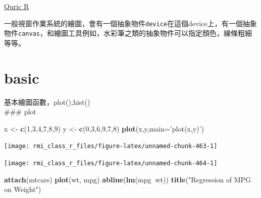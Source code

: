 \documentclass[]{book}
\newenvironment{Shaded}{\begin{snugshade}}{\end{snugshade}}
\newcommand{\DataTypeTok}[1]{\textcolor[rgb]{0.13,0.29,0.53}{#1}}
\newcommand{\DecValTok}[1]{\textcolor[rgb]{0.00,0.00,0.81}{#1}}
\newcommand{\KeywordTok}[1]{\textcolor[rgb]{0.13,0.29,0.53}{\textbf{#1}}}
\newcommand{\NormalTok}[1]{#1}
\newcommand{\OperatorTok}[1]{\textcolor[rgb]{0.81,0.36,0.00}{\textbf{#1}}}
\newcommand{\StringTok}[1]{\textcolor[rgb]{0.31,0.60,0.02}{#1}}
\theoremstyle{definition}
\theoremstyle{definition}
\theoremstyle{definition}
\theoremstyle{remark}
\begin{document}
\href{https://www.statmethods.net/graphs/creating.html}{Quric R}

一般視窗作業系統的繪圖，會有一個抽象物件\texttt{device}在這個device上，有一個抽象物件\texttt{canvas}，和繪圖工具例如，水彩筆之類的抽象物件可以指定顏色，線條粗細等等。

\hypertarget{basic}{%
\section{basic}\label{basic}}

基本繪圖函數，plot(),hist()\\
\#\#\# plot

\begin{Shaded}
\begin{Highlighting}[]
\NormalTok{x <-}\StringTok{ }\KeywordTok{c}\NormalTok{(}\DecValTok{1}\NormalTok{,}\DecValTok{3}\NormalTok{,}\DecValTok{4}\NormalTok{,}\DecValTok{7}\NormalTok{,}\DecValTok{8}\NormalTok{,}\DecValTok{9}\NormalTok{)}
\NormalTok{y <-}\StringTok{ }\KeywordTok{c}\NormalTok{(}\DecValTok{0}\NormalTok{,}\DecValTok{3}\NormalTok{,}\DecValTok{6}\NormalTok{,}\DecValTok{9}\NormalTok{,}\DecValTok{7}\NormalTok{,}\DecValTok{8}\NormalTok{)}
\KeywordTok{plot}\NormalTok{(x,y,}\DataTypeTok{main=}\StringTok{'plot(x,y)'}\NormalTok{)}
\end{Highlighting}
\end{Shaded}

\begin{center}\texttt{[image: rmi\_class\_r\_files/figure-latex/unnamed-chunk-463-1]} \end{center}

\begin{Shaded}
\end{Shaded}

\begin{center}\texttt{[image: rmi\_class\_r\_files/figure-latex/unnamed-chunk-464-1]} \end{center}

\begin{Shaded}
\begin{Highlighting}[]
\KeywordTok{attach}\NormalTok{(mtcars)}
\KeywordTok{plot}\NormalTok{(wt, mpg) }
\KeywordTok{abline}\NormalTok{(}\KeywordTok{lm}\NormalTok{(mpg}\OperatorTok{~}\NormalTok{wt))}
\KeywordTok{title}\NormalTok{(}\StringTok{"Regression of MPG on Weight"}\NormalTok{)}
\end{Highlighting}
\end{Shaded}
\end{document}
